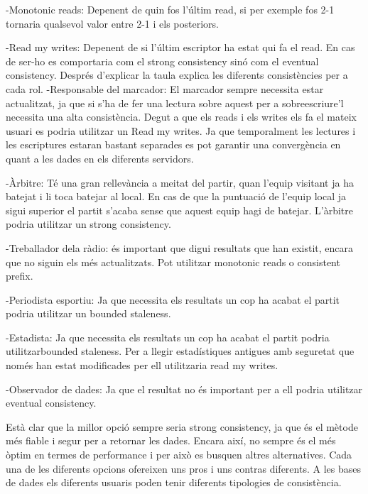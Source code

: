 \documentclass[a4paper, 10pt]{article}
\begin{document}
-Monotonic reads: Depenent de quin fos l'últim read, si per exemple fos 2-1 tornaria qualsevol valor entre 2-1 i els posteriors.


-Read my writes: Depenent de si l'últim escriptor ha estat qui fa el read. En cas de ser-ho es comportaria com el strong consistency sinó com el
eventual consistency.
\newline
\newline
Després d'explicar la taula explica les diferents consistències per a cada rol.
\newline
\newline
-Responsable del marcador: El marcador sempre necessita estar actualitzat, ja que si s'ha de fer una lectura sobre aquest per a sobreescriure'l necessita una alta consistència. Degut a que els reads i els
writes els fa el mateix usuari es podria utilitzar un Read my writes. Ja que temporalment les lectures i les escriptures estaran bastant separades es pot garantir una convergència en quant a les dades en els diferents servidors.


-Àrbitre: Té una gran rellevància a meitat del partir, quan l'equip visitant ja ha batejat i li toca batejar al local. En cas de que la puntuació de l'equip local ja sigui superior el partit s'acaba sense que aquest equip hagi de batejar.
L'àrbitre podria utilitzar un strong consistency.


-Treballador dela ràdio: és important que digui resultats que han existit, encara que no siguin els més actualitzats. Pot utilitzar monotonic reads o consistent prefix.


-Periodista esportiu: Ja que necessita els resultats un cop ha acabat el partit podria utilitzar un bounded staleness.


-Estadista: Ja que necessita els resultats un cop ha acabat el partit podria utilitzarbounded staleness. Per a llegir estadístiques antigues amb seguretat que només han estat modificades per ell utilitzaria read my writes.


-Observador de dades: Ja que el resultat no és important per a ell podria utilitzar eventual consistency.
\newline

Està clar que la millor opció sempre seria strong consistency, ja que és el mètode més fiable i segur per a retornar les dades. Encara així, no sempre és el més òptim en termes de performance i per això es busquen altres alternatives. 
Cada una de les diferents opcions ofereixen uns pros i uns contras diferents. A les bases de dades els diferents usuaris poden tenir diferents tipologies de consistència.
\end{document}
